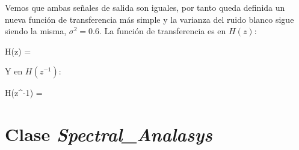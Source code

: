 \documentclass[a4paper, fontsize=11pt]{scrartcl} %
\numberwithin{equation}{section} %
\numberwithin{figure}{section} %
\numberwithin{table}{section} %
\newenvironment{myalign}{\par\nobreak\large\noindent\align}{\endalign} %
\begin{document}
	Vemos que ambas señales de salida son iguales, por tanto queda definida un nueva función de transferencia más simple y la varianza del ruido blanco sigue siendo la misma, $\sigma^2=0.6$. La función de transferencia es en $H(z)$: 
	
	\begin{myalign}
		H(z) = 
	\end{myalign}
	
	Y en $H(z^{-1})$:
	
	\begin{myalign}
		H(z^{-1}) = 
	\end{myalign}
	
	\section{Clase \textit{Spectral\_Analasys}}
	
	
	
\end{document}
